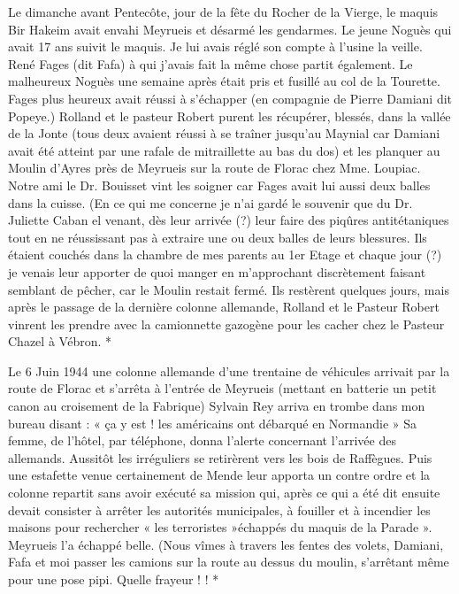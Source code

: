 

\vspace{0.35cm}

Le dimanche avant Pentecôte, jour de la fête du Rocher de la Vierge, le maquis Bir Hakeim
avait envahi Meyrueis et désarmé les gendarmes. Le jeune Noguès qui avait 17 ans suivit le
maquis. Je lui avais réglé son compte à l’usine la veille. René Fages (dit Fafa) à qui j’avais
fait la même chose partit également. Le malheureux Noguès une semaine après était pris et
fusillé au col de la Tourette. Fages plus heureux avait réussi à s’échapper (en compagnie de
Pierre Damiani dit Popeye.) Rolland et le pasteur Robert purent les récupérer, blessés,
dans la vallée de la Jonte (tous deux avaient réussi à se traîner jusqu’au Maynial car
Damiani avait été atteint par une rafale de mitraillette au bas du dos) et les planquer au
Moulin d’Ayres près de Meyrueis sur la route de Florac chez Mme. Loupiac.
Notre ami le Dr. Bouisset vint les soigner car Fages avait lui aussi deux balles dans la cuisse.
(En ce qui me concerne je n’ai gardé le souvenir que du Dr. Juliette Caban el venant, dès leur
arrivée (?) leur faire des piqûres antitétaniques tout en ne réussissant pas à extraire une ou
deux balles de leurs blessures. Ils étaient couchés dans la chambre de mes parents au 1er
Etage et chaque jour (?) je venais leur apporter de quoi manger en m’approchant
discrètement faisant semblant de pêcher, car le Moulin restait fermé. Ils restèrent quelques
jours, mais après le passage de la dernière colonne allemande, Rolland et le Pasteur Robert
vinrent les prendre avec la camionnette gazogène pour les cacher chez le Pasteur Chazel à
Vébron. *

\vspace{0.45cm}

Le 6 Juin 1944 une colonne allemande d’une trentaine de véhicules arrivait par la route de
Florac et s’arrêta à l’entrée de Meyrueis (mettant en batterie un petit canon au croisement de
la Fabrique) Sylvain Rey arriva en trombe dans mon bureau disant : « ça y est ! les
américains ont débarqué en Normandie » Sa femme, de l’hôtel, par téléphone, donna l’alerte
concernant l’arrivée des allemands. Aussitôt les irréguliers se retirèrent vers les bois de
Raffègues.
Puis une estafette venue certainement de Mende leur apporta un contre ordre et la colonne
repartit sans avoir exécuté sa mission qui, après ce qui a été dit ensuite devait consister à
arrêter les autorités municipales, à fouiller et à incendier les maisons pour rechercher « les
terroristes »échappés du maquis de la Parade ». Meyrueis l’a échappé belle. (Nous vîmes à
travers les fentes des volets, Damiani, Fafa et moi passer les camions sur la route au dessus
du moulin, s’arrêtant même pour une pose pipi. Quelle frayeur ! ! *

